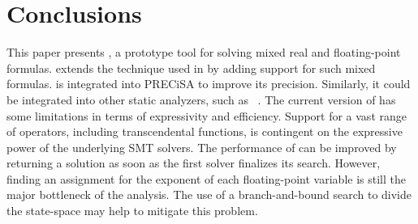 \documentclass[runningheads,american,orivec,fleqn]{llncs}
\begin{document}
\section{Conclusions}
\label{sec:conclusion}
% 
This paper presents \smttool{}, a prototype tool for solving mixed real and floating-point formulas.
%
\smttool{} extends the technique used in \Realizer{} by adding support
for such mixed formulas.
%
\smttool{} is integrated into PRECiSA to improve its precision.
% 
Similarly, it could be integrated into other static analyzers, such as \FPTaylor~\cite{SolovyevJRG15}.
%
% 
The current version of \smttool{} has some limitations in terms of expressivity and efficiency.
%
Support for a vast range of operators, including transcendental functions, is contingent on the expressive power of the underlying SMT solvers.
%
The performance of \smttool{} can be improved by returning a solution as soon as the first solver finalizes its search.
% 
However, finding an assignment for the exponent of each floating-point variable is still the major bottleneck of the analysis.
%
The use of a branch-and-bound search to divide the state-space may help to mitigate this problem.



\end{document}
